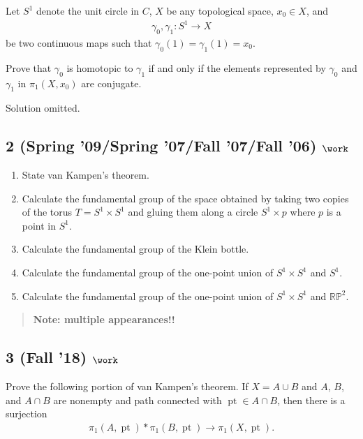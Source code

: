 Let \(S^1\) denote the unit circle in \(C\), \(X\) be any topological
space, \(x_0 \in X\), and
\begin{align*}\gamma_0, \gamma_1 : S^1 \to X\end{align*}
be two continuous maps such that \(\gamma_0 (1) = \gamma_1 (1) = x_0\).

Prove that \(\gamma_0\) is homotopic to \(\gamma_1\) if and only if the
elements represented by \(\gamma_0\) and \(\gamma_1\) in
\(\pi_1 (X, x_0 )\) are conjugate.


Solution omitted.

\hypertarget{spring-09spring-07fall-07fall-06-work}{%
\subsection{\texorpdfstring{2 (Spring '09/Spring '07/Fall '07/Fall '06)
\(\work\)}{2 (Spring '09/Spring '07/Fall '07/Fall '06) \textbackslash work}}\label{spring-09spring-07fall-07fall-06-work}}

\begin{enumerate}
\def\labelenumi{\alph{enumi}.}
\item
  State van Kampen's theorem.
\item
  Calculate the fundamental group of the space obtained by taking two
  copies of the torus \(T = S^1 \times S^1\) and gluing them along a
  circle \(S^1 \times {p}\) where \(p\) is a point in \(S^1\).
\item
  Calculate the fundamental group of the Klein bottle.
\item
  Calculate the fundamental group of the one-point union of
  \(S^1 \times S^1\) and \(S^1\).
\item
  Calculate the fundamental group of the one-point union of
  \(S^1 \times S^1\) and \({\mathbb{RP}}^2\).
\end{enumerate}

\begin{quote}
\textbf{Note: multiple appearances!!}
\end{quote}

\hypertarget{fall-18-work-2}{%
\subsection{\texorpdfstring{3 (Fall '18)
\(\work\)}{3 (Fall '18) \textbackslash work}}\label{fall-18-work-2}}

Prove the following portion of van Kampen's theorem. If \(X = A\cup B\)
and \(A\), \(B\), and \(A \cap B\) are nonempty and path connected with
\({\operatorname{pt}}\in A \cap B\), then there is a surjection
\begin{align*}
\pi_1 (A, {\operatorname{pt}}) \ast \pi_1 (B, {\operatorname{pt}}) \to \pi_1 (X, {\operatorname{pt}})
.\end{align*}

